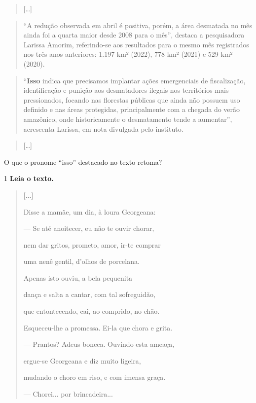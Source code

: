 \begin{quote}
{[}\ldots{]}
\end{quote}

\begin{quote}
``A redução observada em abril é positiva, porém, a área desmatada no
mês ainda foi a quarta maior desde 2008 para o mês'', destaca a
pesquisadora Larissa Amorim, referindo-se aos resultados para o mesmo
mês registrados nos três anos anteriores: 1.197 km² (2022), 778 km²
(2021) e 529 km² (2020).
\end{quote}

\begin{quote}
``\textbf{Isso} indica que precisamos implantar ações emergenciais de
fiscalização, identificação e punição aos desmatadores ilegais nos
territórios mais pressionados, focando nas florestas públicas que ainda
não possuem uso definido e nas áreas protegidas, principalmente com a
chegada do verão amazônico, onde historicamente o desmatamento tende a
aumentar'', acrescenta Larissa, em nota divulgada pelo instituto.
\end{quote}

\begin{quote}
{[}\ldots{]}
\end{quote}


O que o pronome ``isso'' destacado no texto retoma?



\num{1} \textbf{Leia o texto.}

\begin{quote}
{[}...{]}

Disse a mamãe, um dia, à loura Georgeana:

--- Se até anoitecer, eu não te ouvir chorar,

nem dar gritos, prometo, amor, ir-te comprar

uma nenê gentil, d'olhos de porcelana.

Apenas isto ouviu, a bela pequenita

dança e salta a cantar, com tal sofreguidão,

que entontecendo, cai, ao comprido, no chão.

Esqueceu-lhe a promessa. Ei-la que chora e grita.

--- Prantos? Adeus boneca. Ouvindo esta ameaça,

ergue-se Georgeana e diz muito ligeira,

mudando o choro em riso, e com imensa graça.

--- Chorei... por brincadeira...
\end{quote}

